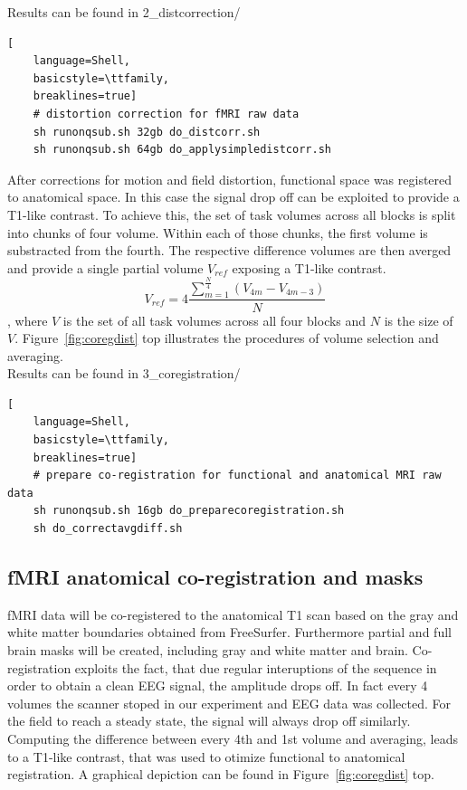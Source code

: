 \documentclass[12pt,a4paper]{scrartcl}
\begin{document}
\noindent Results can be found in 2\_distcorrection/\\
\begin{lstlisting}[
    language=Shell,
    basicstyle=\ttfamily,
    breaklines=true]
    # distortion correction for fMRI raw data
    sh runonqsub.sh 32gb do_distcorr.sh
    sh runonqsub.sh 64gb do_applysimpledistcorr.sh
\end{lstlisting}
After corrections for motion and field distortion, functional space was registered to anatomical space. In this case the signal drop off can be exploited to provide a T1-like contrast. To achieve this, the set of task volumes across all blocks is split into chunks of four volume. Within each of those chunks, the first volume is substracted from the fourth. The respective difference volumes are then averged and provide a single partial volume $V_{ref}$ exposing a T1-like contrast.
\begin{equation}
  V_{ref}=4\frac{\sum_{m=1}^{\frac{N}{4}}(V_{4m}-V_{4m-3})}{N}
\end{equation}
\noindent, where $V$ is the set of all task volumes across all four blocks and $N$ is the size of $V$. Figure~\ref{fig:coregdist} top illustrates the procedures of volume selection and averaging.\\

\noindent Results can be found in 3\_coregistration/\\
\begin{lstlisting}[
    language=Shell,
    basicstyle=\ttfamily,
    breaklines=true]
    # prepare co-registration for functional and anatomical MRI raw data
    sh runonqsub.sh 16gb do_preparecoregistration.sh
    sh do_correctavgdiff.sh
\end{lstlisting}

\subsection{fMRI anatomical co-registration and masks}
fMRI data will be co-registered to the anatomical T1 scan based on the gray and white matter boundaries obtained from FreeSurfer. Furthermore partial and full brain masks will be created, including gray and white matter and brain. Co-registration exploits the fact, that due regular interuptions of the sequence in order to obtain a clean EEG signal, the amplitude drops off. In fact every 4 volumes the scanner stoped in our experiment and EEG data was collected. For the field to reach a steady state, the signal will always drop off similarly.\\
\noindent Computing the difference between every 4th and 1st volume and averaging, leads to a T1-like contrast, that was used to otimize functional to anatomical registration. A graphical depiction can be found in Figure~\ref{fig:coregdist} top.\\
\end{document}
